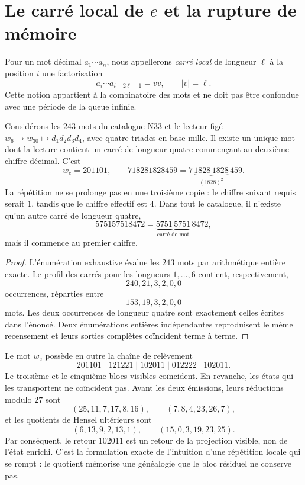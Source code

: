 \ifdefined\HMTRepetirResultadosTaxonomicos
\section{Le carré local de \texorpdfstring{\(e\)}{e} et la rupture de mémoire}

Pour un mot décimal \(a_1\cdots a_n\), nous appellerons \emph{carré local}
de longueur \(\ell\) à la position \(i\) une factorisation
\[
 a_i\cdots a_{i+2\ell-1}=vv,
 \qquad |v|=\ell.
\]
Cette notion appartient à la combinatoire des mots et ne doit pas être confondue avec
une période de la queue infinie.

\begin{theorem}
Considérons les \(243\) mots du catalogue N33 et le lecteur figé
\(w_6\mapsto w_{30}\mapsto d_1d_2d_3d_4\), avec quatre triades en base mille.
Il existe un unique mot dont la lecture contient un carré de longueur quatre
commençant au deuxième chiffre décimal. C’est
\[
 w_e=201101,
 \qquad
 718281828459=7\,\underbrace{1828\,1828}_{(1828)^2}\,459.
\]
La répétition ne se prolonge pas en une troisième copie : le chiffre suivant requis
serait \(1\), tandis que le chiffre effectif est \(4\). Dans tout le catalogue,
il n’existe qu’un autre carré de longueur quatre,
\[
 575157518472=\underbrace{5751\,5751}_{\text{carré de mot}}\,8472,
\]
mais il commence au premier chiffre.
\end{theorem}

\begin{proof}
L’énumération exhaustive évalue les \(243\) mots par arithmétique
entière exacte. Le profil des carrés pour les longueurs \(1,\ldots,6\) contient,
respectivement,
\[
240, 21, 3, 2, 0, 0
\]
occurrences, réparties entre
\[
153, 19, 3, 2, 0, 0
\]
mots. Les deux occurrences de longueur quatre sont exactement celles écrites
dans l’énoncé. Deux énumérations entières indépendantes reproduisent le même
recensement et leurs sorties complètes coïncident terme à terme.
\end{proof}

Le mot \(w_e\) possède en outre la chaîne de relèvement
\[
201101\mid121221\mid102011\mid012222\mid102011.
\]
Le troisième et le cinquième blocs visibles coïncident. En revanche,
les états qui les transportent ne coïncident pas. Avant les deux émissions, leurs réductions
modulo \(27\) sont
\[
(25,11,7,17,8,16),
\qquad
(7,8,4,23,26,7),
\]
et les quotients de Hensel ultérieurs sont
\[
(6,13,9,2,13,1),
\qquad
(15,0,3,19,23,25).
\]
Par conséquent, le retour \(102011\) est un retour de la projection visible, non
de l’état enrichi. C’est la formulation exacte de l’intuition d’une
répétition locale qui se rompt : le quotient mémorise une généalogie que le
bloc résiduel ne conserve pas.

